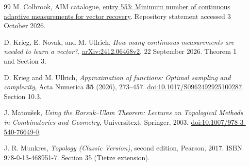 \documentclass[11pt,a4paper]{article}
\theoremstyle{remark}
\begin{document}
\begin{thebibliography}{99}
M. Colbrook, AIM catalogue, \href{https://github.com/MColbrook/AIM/blob/59a8f0c2957dd272f56bcf282dfe0c066a15f441/problems/553-continuous-adaptive-measurement-complexity.md}{entry 553: Minimum number of continuous adaptive measurements for vector recovery}. Repository statement accessed 3 October 2026.


D. Krieg, E. Novak, and M. Ullrich, \emph{How many continuous measurements are needed to learn a vector?}, \href{https://arxiv.org/abs/2412.06468v2}{arXiv:2412.06468v2}, 22 September 2026. Theorem 1 and Section 3.

D. Krieg and M. Ullrich, \emph{Approximation of functions: Optimal sampling and complexity}, Acta Numerica \textbf{35} (2026), 273--457. \href{https://doi.org/10.1017/S0962492925100287}{doi:10.1017/S0962492925100287}. Section 10.3.

J. Matou\v{s}ek, \emph{Using the Borsuk--Ulam Theorem: Lectures on Topological Methods in Combinatorics and Geometry}, Universitext, Springer, 2003. \href{https://doi.org/10.1007/978-3-540-76649-0}{doi:10.1007/978-3-540-76649-0}.

J. R. Munkres, \emph{Topology (Classic Version)}, second edition, Pearson, 2017. ISBN 978-0-13-468951-7. Section 35 (Tietze extension).


\end{thebibliography}
\end{document}

